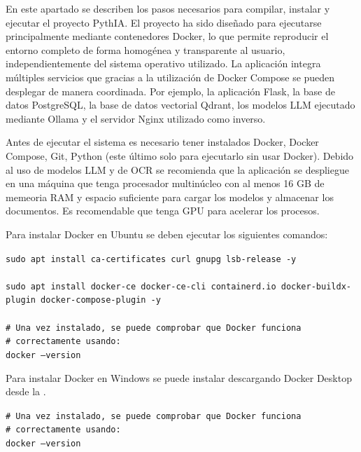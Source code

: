 En este apartado se describen los pasos necesarios para compilar, instalar y ejecutar el proyecto PythIA. El proyecto ha sido diseñado para ejecutarse principalmente mediante contenedores Docker, lo que permite reproducir el entorno completo de forma homogénea y transparente al usuario, independientemente del sistema operativo utilizado. La aplicación integra múltiples servicios que gracias a la utilización de Docker Compose se pueden desplegar de manera coordinada. Por ejemplo, la aplicación Flask, la base de datos PostgreSQL, la base de datos vectorial Qdrant, los modelos LLM ejecutado mediante Ollama y el servidor Nginx utilizado como  inverso.

Antes de ejecutar el sistema es necesario tener instalados Docker, Docker Compose, Git, Python (este último solo para ejecutarlo sin usar Docker). Debido al uso de modelos LLM y de OCR se recomienda que la aplicación se despliegue en una máquina que tenga procesador multinúcleo con al menos 16 GB de memeoria RAM y espacio suficiente para cargar los modelos y almacenar los documentos. Es recomendable que tenga GPU para acelerar los procesos.

Para instalar Docker en Ubuntu se deben ejecutar los siguientes comandos:

\begin{tcolorbox}[
	colback=black!3,
	colframe=black!30,
	boxrule=0.5pt,
	arc=2mm,
	title= Terminal,
	fonttitle=\bfseries,
	breakable
]
	{\footnotesize
		\noindent
		\texttt{sudo apt install ca-certificates curl gnupg lsb-release -y}\\
		\\
		\texttt{sudo apt install docker-ce docker-ce-cli containerd.io docker-buildx-plugin docker-compose-plugin -y} \\
		\\
		\texttt{\# Una vez instalado, se puede comprobar que Docker funciona}\\
		\texttt{\# correctamente usando:} \\
		\texttt{docker --version}
	}
\end{tcolorbox}

Para instalar Docker en Windows se puede instalar descargando Docker Desktop desde la .

\begin{tcolorbox}[
	colback=black!3,
	colframe=black!30,
	boxrule=0.5pt,
	arc=2mm,
	title= Terminal,
	fonttitle=\bfseries,
	breakable
]
	{\footnotesize
		\noindent
		\texttt{\# Una vez instalado, se puede comprobar que Docker funciona}\\
		\texttt{\# correctamente usando:} \\
		\texttt{docker --version}
	}
\end{tcolorbox}

